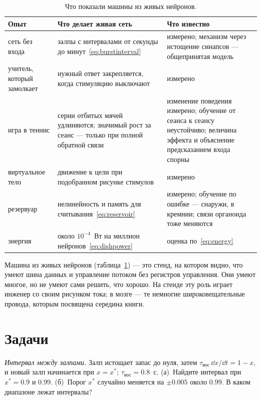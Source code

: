 \begin{table}[t]
\centering
\footnotesize
\setlength{\tabcolsep}{4pt}
\renewcommand{\arraystretch}{1.15}
\begin{tabular}{>{\raggedright}p{2.8cm}>{\raggedright}p{4.2cm}>{\raggedright\arraybackslash}p{5.8cm}}
\toprule
Опыт & Что делает живая сеть & Что известно \\
\midrule
сеть без входа & залпы с интервалами от секунды до минут~\eqref{eq:burstinterval} & измерено; механизм через истощение синапсов --- общепринятая модель \\
учитель, который замолкает & нужный ответ закрепляется, когда стимуляцию выключают & измерено \\
игра в теннис & серии отбитых мячей удлиняются; значимый рост за сеанс --- только при полной обратной связи & изменение поведения измерено; обучение от сеанса к сеансу неустойчиво; величина эффекта и объяснение предсказанием входа спорны \\
виртуальное тело & движение к цели при подобранном рисунке стимулов & измерено \\
резервуар & нелинейность и память для считывания~\eqref{eq:reservoir} & измерено; обучение по ошибке --- снаружи, в кремнии; связи органоида тоже меняются \\
энергия & около $10^{-4}$~Вт на миллион нейронов~\eqref{eq:dishpower} & оценка по~\eqref{eq:energy} \\
\bottomrule
\end{tabular}
\caption{Что показали машины из живых нейронов.}
\label{tab:livingmachine}
\end{table}

Машина из живых нейронов (таблица~\ref{tab:livingmachine}) --- это стенд, на котором видно, что умеют шина данных и управление потоком без регистров управления. Они умеют многое, но не умеют сами решить, что хорошо. На стенде эту роль играет инженер со своим рисунком тока; в мозге --- те немногие широковещательные провода, которым посвящена середина книги.

\section{Задачи}

\begin{exercise}[\lvlA]
\label{ex:21:1}
\emph{Интервал между залпами.} Залп истощает запас до нуля, затем $\tau_{\text{вос}}\,\dd x/\dd t=1-x$, и новый залп начинается при $x=x^*$; $\tau_{\text{вос}}=0.8$~с. (а)~Найдите интервал при $x^*=0.9$ и $0.99$. (б)~Порог $x^*$ случайно меняется на $\pm0.005$ около $0.99$. В каком диапазоне лежат интервалы?
\end{exercise}

